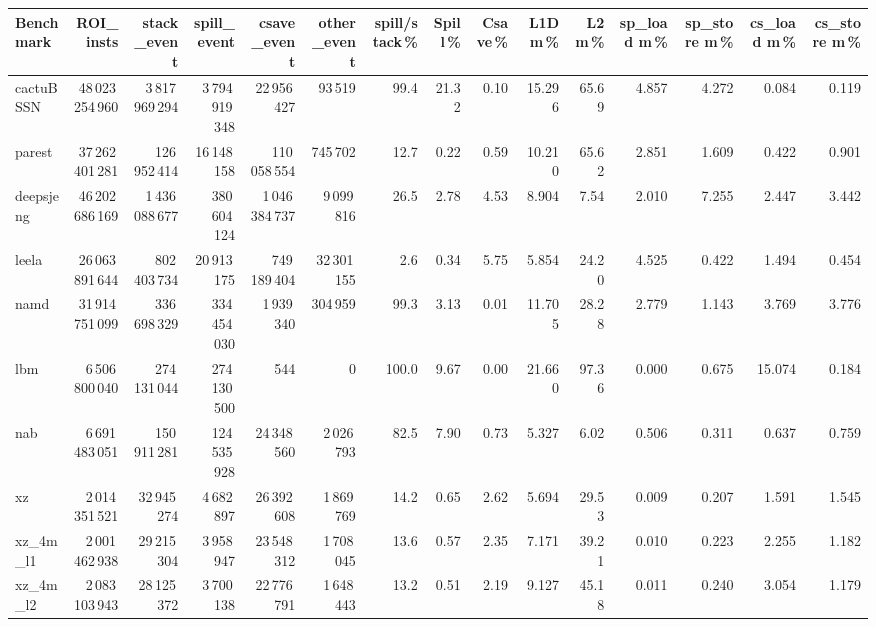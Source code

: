 \documentclass[9pt,landscape,a4paper]{article}
\begin{document}
\vspace{2mm}
\centering
\begin{adjustbox}{max width=\textwidth, max totalheight=0.50\textheight}%
\begin{tabular}{lrrrrrrrrrrrrrr}
\toprule
Benchmark & ROI\_insts & stack\_event & \textbf{spill\_event} & csave\_event & other\_event & spill/stack\,\% & Spill\,\% & Csave\,\% & L1D m\,\% & L2 m\,\% & sp\_load m\,\% & sp\_store m\,\% & cs\_load m\,\% & cs\_store m\,\% \\
\midrule
cactuBSSN & 48\,023\,254\,960 & 3\,817\,969\,294 & 3\,794\,919\,348 & 22\,956\,427 & 93\,519 & 99.4 & 21.32 & 0.10 & 15.296 & 65.69 & 4.857 & 4.272 & 0.084 & 0.119 \\
parest & 37\,262\,401\,281 & 126\,952\,414 & 16\,148\,158 & 110\,058\,554 & 745\,702 & 12.7 & 0.22 & 0.59 & 10.210 & 65.62 & 2.851 & 1.609 & 0.422 & 0.901 \\
deepsjeng & 46\,202\,686\,169 & 1\,436\,088\,677 & 380\,604\,124 & 1\,046\,384\,737 & 9\,099\,816 & 26.5 & 2.78 & 4.53 & 8.904 & 7.54 & 2.010 & 7.255 & 2.447 & 3.442 \\
leela & 26\,063\,891\,644 & 802\,403\,734 & 20\,913\,175 & 749\,189\,404 & 32\,301\,155 & 2.6 & 0.34 & 5.75 & 5.854 & 24.20 & 4.525 & 0.422 & 1.494 & 0.454 \\
namd & 31\,914\,751\,099 & 336\,698\,329 & 334\,454\,030 & 1\,939\,340 & 304\,959 & 99.3 & 3.13 & 0.01 & 11.705 & 28.28 & 2.779 & 1.143 & 3.769 & 3.776 \\
lbm & 6\,506\,800\,040 & 274\,131\,044 & 274\,130\,500 & 544 & 0 & 100.0 & 9.67 & 0.00 & 21.660 & 97.36 & 0.000 & 0.675 & 15.074 & 0.184 \\
nab & 6\,691\,483\,051 & 150\,911\,281 & 124\,535\,928 & 24\,348\,560 & 2\,026\,793 & 82.5 & 7.90 & 0.73 & 5.327 & 6.02 & 0.506 & 0.311 & 0.637 & 0.759 \\
xz & 2\,014\,351\,521 & 32\,945\,274 & 4\,682\,897 & 26\,392\,608 & 1\,869\,769 & 14.2 & 0.65 & 2.62 & 5.694 & 29.53 & 0.009 & 0.207 & 1.591 & 1.545 \\
xz\_4m\_l1 & 2\,001\,462\,938 & 29\,215\,304 & 3\,958\,947 & 23\,548\,312 & 1\,708\,045 & 13.6 & 0.57 & 2.35 & 7.171 & 39.21 & 0.010 & 0.223 & 2.255 & 1.182 \\
xz\_4m\_l2 & 2\,083\,103\,943 & 28\,125\,372 & 3\,700\,138 & 22\,776\,791 & 1\,648\,443 & 13.2 & 0.51 & 2.19 & 9.127 & 45.18 & 0.011 & 0.240 & 3.054 & 1.179 \\

\end{tabular}
\end{adjustbox}
\end{document}
